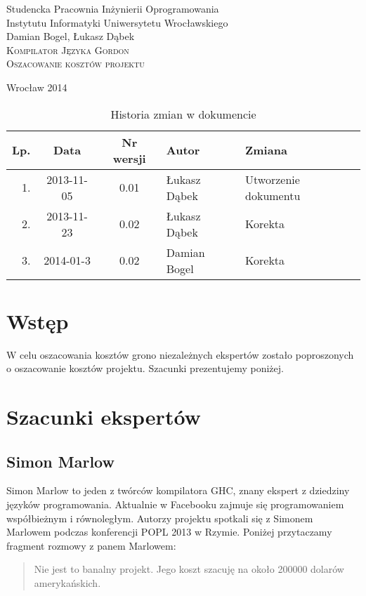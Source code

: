 \documentclass{documentation}
\begin{document}
\begin{titlepage}
\begin{center}
Studencka Pracownia Inżynierii Oprogramowania\\
Instytutu Informatyki Uniwersytetu Wrocławskiego\\[6cm]

Damian Bogel, Łukasz Dąbek\\[1cm]
\textsc{\LARGE Kompilator Języka Gordon}\\[0.5cm]
\textsc{\large Oszacowanie kosztów projektu}

\vfill
Wrocław 2014 \\[2.5cm]

\end{center}
\end{titlepage}

\newpage
\begin{table}
	\centering
    \captionsetup{name=Tabela,labelsep=period}
	\caption{Historia zmian w dokumencie}
		\begin{tabular}{|r|c|c|l|l|}
		\hline
		Lp.  & Data       & Nr wersji & Autor                 & Zmiana \\ \hline
		1.   & 2013-11-05 & 0.01 & Łukasz Dąbek & Utworzenie dokumentu \\ \hline
		2.   & 2013-11-23 & 0.02 & Łukasz Dąbek & Korekta             \\ \hline
		3.   & 2014-01-3 & 0.02 & Damian Bogel & Korekta             \\ \hline
	\end{tabular}
\end{table}
\newpage

\tableofcontents
\setcounter{page}{2}

\newpage

\section{Wstęp}
\noindent W celu oszacowania kosztów grono niezależnych ekspertów zostało poproszonych
o oszacowanie kosztów projektu. Szacunki prezentujemy poniżej.

\section{Szacunki ekspertów}
\subsection{Simon Marlow}
\noindent Simon Marlow to jeden z twórców kompilatora \textsc{GHC}, znany ekspert
z dziedziny języków programowania. Aktualnie w Facebooku zajmuje się programowaniem
współbieżnym i równoległym. Autorzy projektu spotkali się z Simonem Marlowem podczas
konferencji POPL 2013 w Rzymie. Poniżej przytaczamy fragment rozmowy z panem Marlowem:
\begin{quotation}
    Nie jest to banalny projekt. Jego koszt szacuję na około 200000 dolarów amerykańskich.
\end{quotation}
\end{document}
